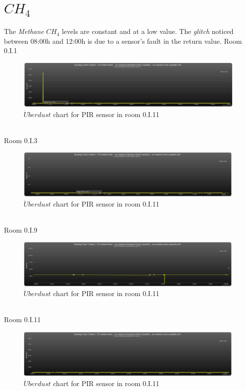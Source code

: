 \documentclass[12pt,a4paper,draft]{report}
\begin{document}
\section{$CH_4$}
%
The \textit{Methane} $CH_4$ levels are constant and at a low value.
The \textit{glitch} noticed between 08:00h and 12:00h is due to a sensor's fault in the return value.
{Room 0.I.1}
%
\begin{figure}[H]
\centering
	\includegraphics*[scale=0.3]{ch4_1}
	\caption{$\ddot{U}berdust$ chart for PIR sensor in room 0.I.11}
	\label{chart_ch4_1}
\end{figure}
\ \\
%
{Room 0.I.3}
%
\begin{figure}[H]
\centering
	\includegraphics*[scale=0.3]{ch4_3}
	\caption{$\ddot{U}berdust$ chart for PIR sensor in room 0.I.11}
	\label{chart_ch4_3}
\end{figure}
\ \\
%
{Room 0.I.9}
%
\begin{figure}[H]
\centering
	\includegraphics*[scale=0.3]{ch4_9}
	\caption{$\ddot{U}berdust$ chart for PIR sensor in room 0.I.11}
	\label{chart_ch4_9}
\end{figure}
\ \\
%
{Room 0.I.11}
%
\begin{figure}[H]
\centering
	\includegraphics*[scale=0.3]{ch4_11}
	\caption{$\ddot{U}berdust$ chart for PIR sensor in room 0.I.11}
	\label{chart_ch4_11}
\end{figure}
\ \\
%
\end{document}
